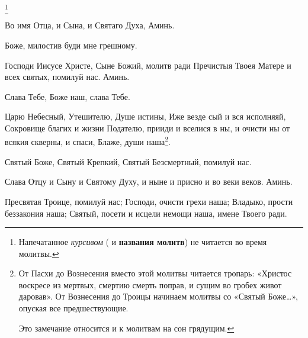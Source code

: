 \mychapterending


\begin{mymulticols}


\footnote{Напечатанное \emph{курсивом} ( и \textbf{названия молитв}) не читается во время молитвы.}

Во имя Отца, и Сына, и Святаго Духа, Аминь.

\medskip{}


Боже, милостив буди мне грешному. 


Господи Иисусе Христе, Сыне Божий, молитв ради Пречистыя Твоея Матере и всех святых, помилуй нас. Аминь.

Слава Тебе, Боже наш, слава Тебе.


Царю Небесный, Утешителю, Душе истины, Иже везде сый и вся исполняяй, Сокровище благих и жизни Подателю, прииди и вселися в ны, и очисти ны от всякия скверны, и спаси, Блаже, души наша\footnote{От Пасхи до Вознесения вместо этой молитвы читается тропарь: «Христос воскресе из мертвых, смертию смерть поправ, и сущим во гробех живот даровав».  От Вознесения до Троицы начинаем молитвы со «Святый Боже…», опуская все предшествующие.

Это замечание относится и к молитвам на сон грядущим.
}.


Святый Боже, Святый Крепкий, Святый Безсмертный, помилуй нас. 

Слава Отцу и Сыну и Святому Духу, и ныне и присно и во веки веков. Аминь.


Пресвятая Троице, помилуй нас; Господи, очисти грехи наша; Владыко, прости беззакония наша; Святый, посети и исцели немощи наша, имене Твоего ради.


\end{mymulticols}
